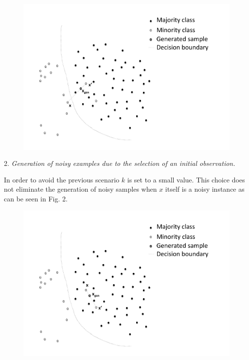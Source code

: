 \documentclass[parskip=full]{scrartcl}
\begin{document}
\begin{figure}[H]
	\centering
	\includegraphics[width=12cm, keepaspectratio]{./artifacts/fig1}
\end{figure}

2. \textit{Generation of noisy examples due to the selection of an initial
observation.}

In order to avoid the previous scenario \( k \) is set to a small value. This
choice does not eliminate the generation of noisy samples when \( x \) itself is
a noisy instance as can be seen in Fig. 2.

\begin{figure}[H]
	\centering
	\includegraphics[width=12cm, keepaspectratio]{./artifacts/fig2}
\end{figure}
\end{document}

